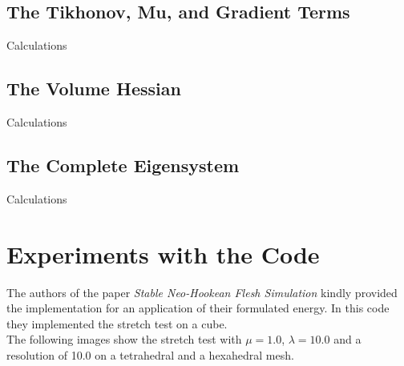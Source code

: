 \subsection{The Tikhonov, Mu, and Gradient Terms}
Calculations

\subsection{The Volume Hessian}
Calculations
 
\subsection{The Complete Eigensystem}
Calculations

\section{Experiments with the Code}
The authors of the paper \textit{Stable Neo-Hookean Flesh Simulation} \cite{Smith:2018:SNF:3191713.3180491} kindly provided the implementation for an application of their formulated energy. In this code they implemented the stretch test on a cube. 
\\
The following images show the stretch test with $\mu = 1.0$, $\lambda = 10.0$ and a resolution of 10.0 on a tetrahedral and a hexahedral mesh.

